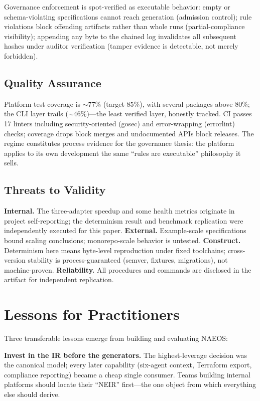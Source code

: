 \documentclass[sigconf,nonacm]{acmart}
\begin{document}
Governance enforcement is spot-verified as executable behavior: empty or schema-violating specifications cannot reach generation (admission control); rule violations block offending artifacts rather than whole runs (partial-compliance visibility); appending any byte to the chained log invalidates all subsequent hashes under auditor verification (tamper evidence is detectable, not merely forbidden).

\subsection{Quality Assurance}
Platform test coverage is ${\sim}77\%$ (target 85\%), with several packages above 80\%; the CLI layer trails ($\sim$46\%)---the least verified layer, honestly tracked. CI passes 17 linters including security-oriented (gosec) and error-wrapping (errorlint) checks; coverage drops block merges and undocumented APIs block releases. The regime constitutes process evidence for the governance thesis: the platform applies to its own development the same ``rules are executable'' philosophy it sells.

\subsection{Threats to Validity}
\label{sec:threats}
\textbf{Internal.} The three-adapter speedup and some health metrics originate in project self-reporting; the determinism result and benchmark replication were independently executed for this paper. \textbf{External.} Example-scale specifications bound scaling conclusions; monorepo-scale behavior is untested. \textbf{Construct.} Determinism here means byte-level reproduction under fixed toolchains; cross-version stability is process-guaranteed (semver, fixtures, migrations), not machine-proven. \textbf{Reliability.} All procedures and commands are disclosed in the artifact for independent replication.

\section{Lessons for Practitioners}
\label{sec:lessons}
Three transferable lessons emerge from building and evaluating NAEOS:

\textbf{Invest in the IR before the generators.} The highest-leverage decision was the canonical model; every later capability (six-agent context, Terraform export, compliance reporting) became a cheap single consumer. Teams building internal platforms should locate their ``NEIR'' first---the one object from which everything else should derive.
\end{document}
